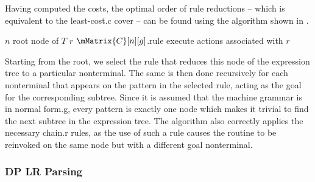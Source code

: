 Having computed the costs, the optimal order of \glspl{rule reduction} -- which
is equivalent to the \gls{least-cost.c} \gls{cover} -- can be found using the
algorithm shown in .
%
\begin{algorithm}[t]
  {%
    $n$ \Assign root node of $T$\;
    $r$ \Assign $\mMatrix{C}[n][g]$.rule\;
    execute actions associated with $r$\;
  }

  \caption[%
            Algorithm for selecting the rules chosen by
          ]%
          {%
            Selects optimal sequence of rules that reduces a given expression
            tree to a given nonterminal, based on costs computed
            by %
          }
\end{algorithm}
%
Starting from the \gls{root}, we select the \gls{rule} that reduces this
\gls{node} of the \gls{expression tree} to a particular \gls{nonterminal}.
%
The same is then done recursively for each \gls{nonterminal} that appears on the
pattern in the selected \gls{rule}, acting as the goal for the corresponding
\gls{subtree}.
%
Since it is assumed that the \gls{machine grammar} is in \gls{normal form.g},
every \gls{pattern} is exactly one \gls{node} which makes it trivial to find the
next \gls{subtree} in the \gls{expression tree}.
%
The algorithm also correctly applies the necessary \gls{chain.r} \glspl{rule},
as the use of such a \gls{rule} causes the routine to be reinvoked on the same
\gls{node} but with a different goal \gls{nonterminal}.


\subsubsection{DP \versus LR Parsing}


